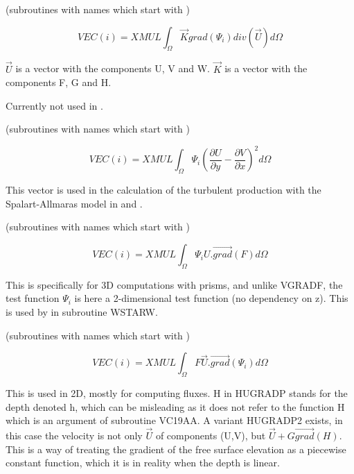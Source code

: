 
(subroutines with names which start with )

\[VEC(i)=XMUL \int _{\Omega }\vec{K} grad(\Psi _{i} )   div(\vec{U}) d\Omega  \]

$\vec{U}$ is a vector with the components U, V and W.
$\vec{K}$ is a vector with the components F, G and H.

Currently not used in \tel.






(subroutines with names which start with )

\[VEC(i)=XMUL \int _{\Omega }\Psi _{i}  \left(\frac{\partial U}{\partial y} -\frac{\partial V}{\partial x}  \right)^2 d\Omega  \]

This vector is used in the calculation of the turbulent production with the
Spalart-Allmaras model in  and .


(subroutines with names which start with )

\[VEC(i)=XMUL \int _{\Omega }\Psi _{i}  U . \overrightarrow{grad} ( F )  d\Omega  \]

This is specifically for 3D computations with prisms, and unlike VGRADF, the
test function $\Psi _{i} $ is here a 2-dimensional test function (no dependency
on z). This is used by  in subroutine WSTARW.


(subroutines with names which start with )

\[VEC(i)=XMUL \int _{\Omega }F \vec{U} . \overrightarrow{grad} ( \Psi _{i}  )  d\Omega  \]

This is used in 2D, mostly for computing fluxes. H in HUGRADP stands for the
depth denoted h, which can be misleading as it does not refer to the function H
which is an argument of subroutine VC19AA. A variant HUGRADP2 exists, in this
case the velocity is not only $\vec{U}$ of components (U,V), but $\vec{U}+G
 \overrightarrow{grad} ( H ) $. This is a way of treating the gradient
of the free surface elevation as a piecewise constant function, which it is in
reality when the depth is linear.

